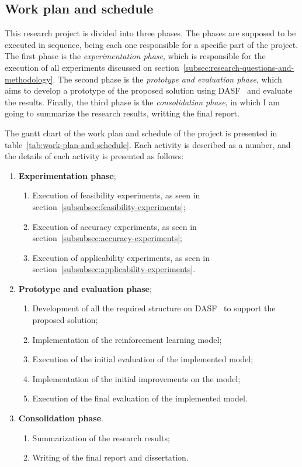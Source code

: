 \subsection{Work plan and schedule}
\label{subsec:work-plan-and-schedule}

This research project is divided into three phases.
The phases are supposed to be executed in sequence, being each one responsible for a specific part of the project.
The first phase is the \emph{experimentation phase}, which is responsible for the execution of all experiments discussed on section~\ref{subsec:research-questions-and-methodology}.
The second phase is the \emph{prototype and evaluation phase}, which aims to develop a prototype of the proposed solution using \ac{DASF}~\cite{dasf} and evaluate the results.
Finally, the third phase is the \emph{consolidation phase}, in which I am going to summarize the research results, writting the final report.

The gantt chart of the work plan and schedule of the project is presented in table~\ref{tab:work-plan-and-schedule}.
Each activity is described as a number, and the details of each activity is presented as follows:

\begin{enumerate}
  \item \textbf{Experimentation phase};
    \begin{enumerate}
      \item Execution of feasibility experiments, as seen in section~\ref{subsubsec:feasibility-experiments};
      \item Execution of accuracy experiments, as seen in section~\ref{subsubsec:accuracy-experiments};
      \item Execution of applicability experiments, as seen in section~\ref{subsubsec:applicability-experiments}.
    \end{enumerate}
  \item \textbf{Prototype and evaluation phase};
    \begin{enumerate}
      \item Development of all the required structure on \ac{DASF}~\cite{dasf} to support the proposed solution;
      \item Implementation of the reinforcement learning model;
      \item Execution of the initial evaluation of the implemented model;
      \item Implementation of the initial improvements on the model;
      \item Execution of the final evaluation of the implemented model.
    \end{enumerate}
  \item \textbf{Consolidation phase}.
    \begin{enumerate}
      \item Summarization of the research results;
      \item Writing of the final report and dissertation.
    \end{enumerate}
\end{enumerate}

